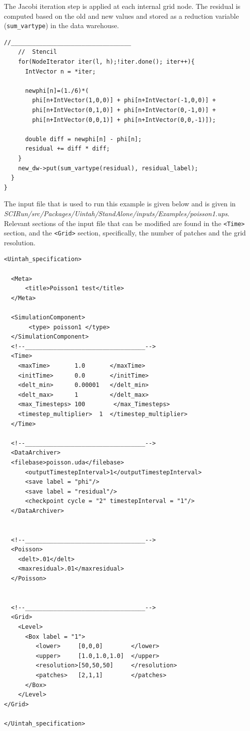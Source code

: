 \documentclass[12pt]{report}
\begin{document}
The Jacobi iteration step is applied at each internal grid node.  The
residual is computed based on the old and new values and stored as a
reduction variable (\texttt{sum\_vartype}) in the data warehouse.

\begin{Verbatim}[fontsize=\footnotesize]
    //__________________________________
    //  Stencil
    for(NodeIterator iter(l, h);!iter.done(); iter++){
      IntVector n = *iter;

      newphi[n]=(1./6)*(
        phi[n+IntVector(1,0,0)] + phi[n+IntVector(-1,0,0)] +
        phi[n+IntVector(0,1,0)] + phi[n+IntVector(0,-1,0)] +
        phi[n+IntVector(0,0,1)] + phi[n+IntVector(0,0,-1)]);

      double diff = newphi[n] - phi[n];
      residual += diff * diff;
    }
    new_dw->put(sum_vartype(residual), residual_label);
  }
}

\end{Verbatim}

The input file that is used to run this example is given below and is
given in
\emph{SCIRun/src/Packages/Uintah/StandAlone/inputs/Examples/poisson1.ups}.
Relevant sections of the input file that can be modified are found in
the \texttt{<Time>} section, and the \texttt{<Grid>} section,
specifically, the number of patches and the grid resolution.

\begin{Verbatim}[fontsize=\footnotesize]
<Uintah_specification>

  <Meta>
      <title>Poisson1 test</title>
  </Meta>

  <SimulationComponent>
       <type> poisson1 </type>
  </SimulationComponent>
  <!--__________________________________-->
  <Time>
    <maxTime>       1.0       </maxTime>
    <initTime>      0.0       </initTime>
    <delt_min>      0.00001   </delt_min>
    <delt_max>      1         </delt_max>
    <max_Timesteps> 100        </max_Timesteps>
    <timestep_multiplier>  1  </timestep_multiplier>
  </Time>

  <!--__________________________________-->
  <DataArchiver>
  <filebase>poisson.uda</filebase>
      <outputTimestepInterval>1</outputTimestepInterval>
      <save label = "phi"/>
      <save label = "residual"/>
      <checkpoint cycle = "2" timestepInterval = "1"/>
  </DataArchiver>


  <!--__________________________________-->
  <Poisson>
    <delt>.01</delt>
    <maxresidual>.01</maxresidual>
  </Poisson>


  <!--__________________________________-->
  <Grid>
    <Level>
      <Box label = "1">
         <lower>     [0,0,0]        </lower>
         <upper>     [1.0,1.0,1.0]  </upper>
         <resolution>[50,50,50]     </resolution>
         <patches>   [2,1,1]        </patches>
      </Box>
    </Level>
</Grid>

</Uintah_specification>

\end{Verbatim}
\end{document}
